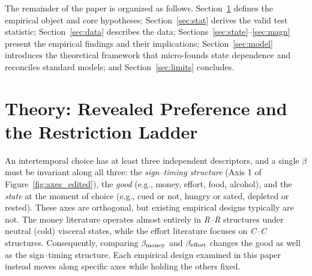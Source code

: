 \documentclass[11pt,a4paper]{article}
\theoremstyle{plain}
\theoremstyle{definition}
\begin{document}
The remainder of the paper is organized as follows. Section~\ref{sec:object} defines the empirical object and core hypotheses; Section~\ref{sec:stat} derives the valid test statistic; Section~\ref{sec:data} describes the data; Sections~\ref{sec:state}--\ref{sec:magn} present the empirical findings and their implications; Section~\ref{sec:model} introduces the theoretical framework that micro-founds state dependence and reconciles standard models; and Section~\ref{sec:limits} concludes.%



\section{Theory: Revealed Preference and the Restriction Ladder}
\label{sec:object}

An intertemporal choice has at least three independent descriptors, and a single $\beta$ must be invariant along all three: the \emph{sign--timing structure} (Axis 1 of Figure~\ref{fig:axes_edited}), the \emph{good} (e.g., money, effort, food, alcohol), and the \emph{state} at the moment of choice (e.g., cued or not, hungry or sated, depleted or rested).
These axes are orthogonal, but existing empirical designs typically are not. The money literature operates almost entirely in \textit{R--R} structures under neutral (cold) visceral states, while the effort literature focuses on \textit{C--C} structures. Consequently, comparing $\beta_{\rm money}$ and $\beta_{\rm effort}$ changes the good as well as the sign--timing structure. Each empirical design examined in this paper instead moves along specific axes while holding the others fixed.
\end{document}
